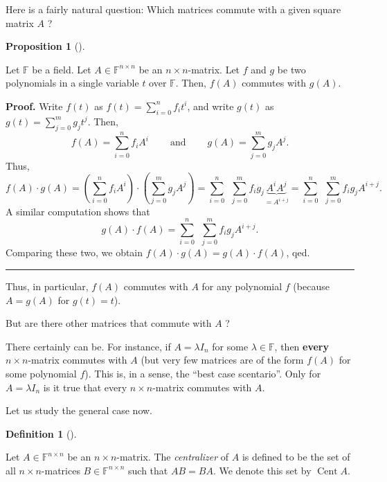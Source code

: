 \documentclass[numbers=enddot,12pt,final,onecolumn,notitlepage]{scrartcl}%
\numberwithin{exer}{subsection}
\theoremstyle{definition}
\newtheorem{prop}[theo]{Proposition}
\newenvironment{proposition}[1][]
{\begin{prop}[#1]\begin{leftbar}}
{\end{leftbar}\end{prop}}
\newtheorem{defi}[theo]{Definition}
\newenvironment{definition}[1][]
{\begin{defi}[#1]\begin{leftbar}}
{\end{leftbar}\end{defi}}
\newenvironment{proof}[1][Proof]{\noindent\textbf{#1.} }{\ \rule{0.5em}{0.5em}}
\let\sumnonlimits\sum
\renewcommand{\sum}{\sumnonlimits\limits}
\begin{document}
Here is a fairly natural question: Which matrices commute with a given square
matrix $A$ ?

\begin{proposition}
Let $\mathbb{F}$ be a field. Let $A\in\mathbb{F}^{n\times n}$ be an $n\times
n$-matrix. Let $f$ and $g$ be two polynomials in a single variable $t$ over
$\mathbb{F}$. Then, $f\left(  A\right)  $ commutes with $g\left(  A\right)  $.
\end{proposition}

\begin{proof}
Write $f\left(  t\right)  $ as $f\left(  t\right)  =\sum_{i=0}^{n}f_{i}t^{i}$,
and write $g\left(  t\right)  $ as $g\left(  t\right)  =\sum_{j=0}^{m}%
g_{j}t^{j}$. Then,%
\[
f\left(  A\right)  =\sum_{i=0}^{n}f_{i}A^{i}\ \ \ \ \ \ \ \ \ \ \text{and}%
\ \ \ \ \ \ \ \ \ \ g\left(  A\right)  =\sum_{j=0}^{m}g_{j}A^{j}.
\]
Thus,%
\[
f\left(  A\right)  \cdot g\left(  A\right)  =\left(  \sum_{i=0}^{n}f_{i}%
A^{i}\right)  \cdot\left(  \sum_{j=0}^{m}g_{j}A^{j}\right)  =\sum_{i=0}%
^{n}\ \ \sum_{j=0}^{m}f_{i}g_{j}\underbrace{A^{i}A^{j}}_{=A^{i+j}}=\sum
_{i=0}^{n}\ \ \sum_{j=0}^{m}f_{i}g_{j}A^{i+j}.
\]
A similar computation shows that%
\[
g\left(  A\right)  \cdot f\left(  A\right)  =\sum_{i=0}^{n}\ \ \sum_{j=0}%
^{m}f_{i}g_{j}A^{i+j}.
\]
Comparing these two, we obtain $f\left(  A\right)  \cdot g\left(  A\right)
=g\left(  A\right)  \cdot f\left(  A\right)  $, qed.
\end{proof}

Thus, in particular, $f\left(  A\right)  $ commutes with $A$ for any
polynomial $f$ (because $A=g\left(  A\right)  $ for $g\left(  t\right)  =t$).

But are there other matrices that commute with $A$ ?

There certainly can be. For instance, if $A=\lambda I_{n}$ for some
$\lambda\in\mathbb{F}$, then \textbf{every} $n\times n$-matrix commutes with
$A$ (but very few matrices are of the form $f\left(  A\right)  $ for some
polynomial $f$). This is, in a sense, the \textquotedblleft best case
scentario\textquotedblright. Only for $A=\lambda I_{n}$ is it true that every
$n\times n$-matrix commutes with $A$.

Let us study the general case now.

\begin{definition}
Let $A\in\mathbb{F}^{n\times n}$ be an $n\times n$-matrix. The
\emph{centralizer} of $A$ is defined to be the set of all $n\times n$-matrices
$B\in\mathbb{F}^{n\times n}$ such that $AB=BA$. We denote this set by
$\operatorname*{Cent}A$.
\end{definition}
\end{document}
